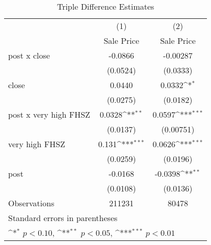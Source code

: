 \begin{table}[htbp]\centering
\def\sym#1{\ifmmode^{#1}\else\(^{#1}\)\fi}
\caption{Triple Difference Estimates\label{tabl}}
\begin{tabular}{l*{2}{c}}
\hline\hline
                    &\multicolumn{1}{c}{(1)}&\multicolumn{1}{c}{(2)}\\
                    &\multicolumn{1}{c}{Sale Price}&\multicolumn{1}{c}{Sale Price}\\
\hline
post x close        &     -0.0866         &    -0.00287         \\
                    &    (0.0524)         &    (0.0333)         \\
[1em]
close               &      0.0440         &      0.0332\sym{*}  \\
                    &    (0.0275)         &    (0.0182)         \\
[1em]
post x very high FHSZ&      0.0328\sym{**} &      0.0597\sym{***}\\
                    &    (0.0137)         &   (0.00751)         \\
[1em]
very high FHSZ      &       0.131\sym{***}&      0.0626\sym{***}\\
                    &    (0.0259)         &    (0.0196)         \\
[1em]
post                &     -0.0168         &     -0.0398\sym{**} \\
                    &    (0.0108)         &    (0.0136)         \\
\hline
Observations        &      211231         &       80478         \\
\hline\hline
\multicolumn{3}{l}{\footnotesize Standard errors in parentheses}\\
\multicolumn{3}{l}{\footnotesize \sym{*} \(p<0.10\), \sym{**} \(p<0.05\), \sym{***} \(p<0.01\)}\\
\end{tabular}
\end{table}
